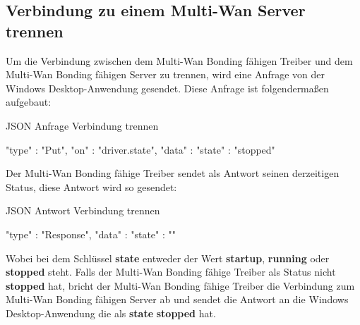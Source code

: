 \subsection{Verbindung zu einem Multi-Wan Server trennen}
Um die Verbindung zwischen dem Multi-Wan Bonding fähigen Treiber und dem Multi-Wan Bonding fähigen Server zu trennen, wird eine Anfrage von der Windows Desktop-Anwendung gesendet. Diese Anfrage ist folgendermaßen aufgebaut:
\begin{program}[H]
\caption{JSON Anfrage Verbindung trennen}
\begin{GenericCode}
    {
        "type" :  "Put",
        "on" :  "driver.state",
        "data" : {"state" : "stopped"} 
    }     
\end{GenericCode}
\end{program}
\noindent
Der Multi-Wan Bonding fähige Treiber sendet als Antwort seinen derzeitigen Status, diese Antwort wird so gesendet:
\begin{program}[H]
\caption{JSON Antwort Verbindung trennen}
\begin{GenericCode}
    {
        "type" :  "Response",
        "data" : {"state" : ""} 
    }    
\end{GenericCode}
\end{program}
\noindent
Wobei bei dem Schlüssel \textbf{state} entweder der Wert \textbf{startup}, \textbf{running} oder \textbf{stopped} steht. Falls der Multi-Wan Bonding fähige Treiber als Status nicht \textbf{stopped} hat, bricht der Multi-Wan Bonding fähige Treiber die Verbindung zum Multi-Wan Bonding fähigen Server ab und sendet die Antwort an die Windows Desktop-Anwendung die als \textbf{state} \textbf{stopped} hat.


